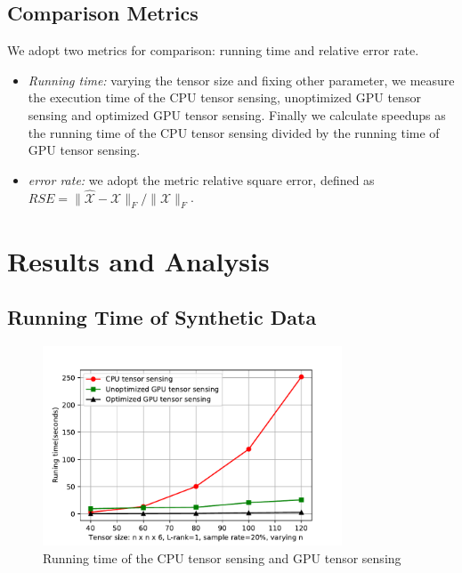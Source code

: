 \documentclass[futureinternet,article,submit,moreauthors,pdftex,10pt,a4paper]{Definitions/mdpi}
\theoremstyle{plain}
\theoremstyle{definition}
\theoremstyle{remark}
\begin{document}
\subsection{Comparison Metrics}
We adopt two metrics for comparison: running time and relative error rate.
\begin{itemize}
    \item \textit{Running time:} varying the tensor size and fixing other parameter, we measure the execution time of the CPU tensor sensing, unoptimized GPU tensor sensing and optimized GPU tensor sensing. Finally we calculate speedups as the running time of the CPU tensor sensing divided by the running time of GPU tensor sensing.
    \item \textit{error rate:} we adopt the metric relative square error, defined as $ RSE = \| \widehat{\mathcal{X}} - \mathcal{X} \|_F / \|\mathcal{X} \|_F $.
\end{itemize}

\section{Results and Analysis}
\label{SEC_RESULT}
\subsection{Running Time of Synthetic Data}
\begin{figure}[t]
    \centering
    \includegraphics[width=3.5in]{runtime.pdf}
    \caption{Running time of the CPU tensor sensing and GPU tensor sensing}
    \label{pic:runtime}
\end{figure}
\end{document}
